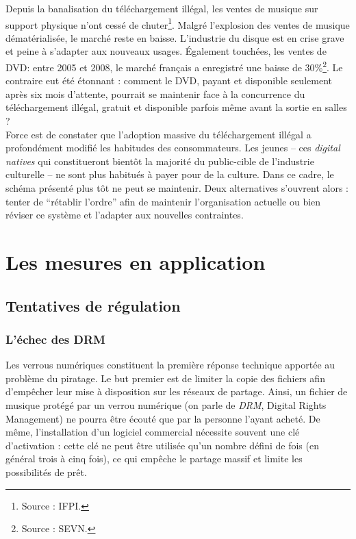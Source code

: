 \documentclass[a4paper]{report}
\begin{document}
	Depuis la banalisation du téléchargement illégal, les ventes de musique sur support physique n'ont cessé de chuter\footnote{Source : IFPI.}. Malgré l'explosion des ventes de musique dématérialisée, le marché reste en baisse. L'industrie du disque est en crise grave et peine à s'adapter aux nouveaux usages. 
	Également touchées, les ventes de DVD: entre 2005 et 2008, le marché français a enregistré une baisse de 30\%\footnote{Source : SEVN.}. Le contraire eut été étonnant : comment le DVD, payant et disponible seulement après six mois d'attente, pourrait se maintenir face à la concurrence du téléchargement illégal, gratuit et disponible parfois même avant la sortie en salles ?\\

	Force est de constater que l'adoption massive du téléchargement illégal a profondément modifié les habitudes des consommateurs. Les jeunes – ces \emph{digital natives} qui constitueront bientôt la majorité du public-cible de l'industrie culturelle – ne sont plus habitués à payer pour de la culture. Dans ce cadre, le schéma présenté plus tôt ne peut se maintenir. Deux alternatives s'ouvrent alors : tenter de ``rétablir l'ordre'' afin de maintenir l'organisation actuelle ou bien réviser ce système et l'adapter aux nouvelles contraintes.





	\chapter{Les mesures en application}

	\section{Tentatives de régulation}

		\subsection{L'échec des DRM}
		Les verrous numériques constituent la première réponse technique apportée au problème du piratage. Le but premier est de limiter la copie des fichiers afin d'empêcher leur mise à disposition sur les réseaux de partage. Ainsi, un fichier de musique protégé par un verrou numérique (on parle de \emph{DRM}, Digital Rights Management) ne pourra être écouté que par la personne l'ayant acheté. De même, l'installation d'un logiciel commercial nécessite souvent une clé d'activation : cette clé ne peut être utilisée qu'un nombre défini de fois (en général trois à cinq fois), ce qui empêche le partage massif et limite les possibilités de prêt.\\
\end{document}

